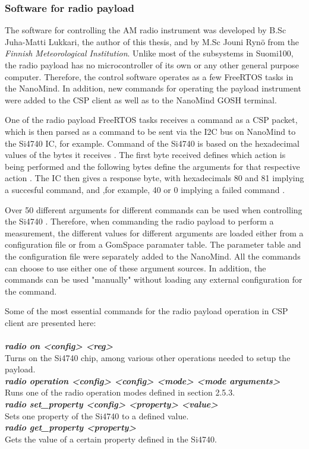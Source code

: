 \documentclass[english,12pt,a4paper,pdftex,elec,utf8]{aaltothesis}
\begin{document}
\subsubsection{Software for radio payload}
The software for controlling the AM radio instrument was developed by B.Sc Juha-Matti Lukkari, the author of this thesis, and by M.Sc Jouni Rynö from the \textit{Finnish Meteorological Institution}. Unlike most of the subsystems in Suomi100, the radio payload has no microcontroller of its own or any other general purpose computer. Therefore, the control software operates as a few FreeRTOS tasks in the NanoMind. In addition, new commands for operating the payload instrument were added to the CSP client as well as to the NanoMind GOSH terminal.  \par
One of the radio payload FreeRTOS tasks receives a command as a CSP packet, which is then parsed as a command to be sent via the I2C bus on NanoMind to the Si4740 IC, for example. Command of the Si4740 is based on the hexadecimal values of the bytes it receives \cite{sids}. The first byte received defines which action is being performed and the following bytes define the arguments for that respective action \cite{sids}. The IC then gives a response byte, with hexadecimals 80 and 81 implying a succesful command, and ,for example, 40 or 0 implying a failed command \cite{sids}. \par
Over 50 different arguments for different commands can be used when controlling the Si4740 \cite{sids}. Therefore, when commanding the radio payload to perform a measurement, the different values for different arguments are loaded either from a configuration file or from a GomSpace paramater table. The parameter table and the configuration file were separately added to the NanoMind. All the commands can choose to use either one of these argument sources. In addition, the commands can be used "manually" without loading any external configuration for the command. \par
Some of the most essential commands for the radio payload operation in CSP client are presented here:
\\
\\
\textit{\textbf{radio on <config> <reg>}}\\
Turns on the Si4740 chip, among various other operations needed to setup the payload.\\
\textit{\textbf{radio operation <config> <config> <mode> <mode arguments>}}\\
Runs one of the radio operation modes defined in section 2.5.3.\\ 
\textit{\textbf{radio set\_property <config> <property> <value>}}\\
Sets one property of the Si4740 to a defined value.\\
\textit{\textbf{radio get\_property <property>}}\\
Gets the value of a certain property defined in the Si4740.\\
\end{document}
